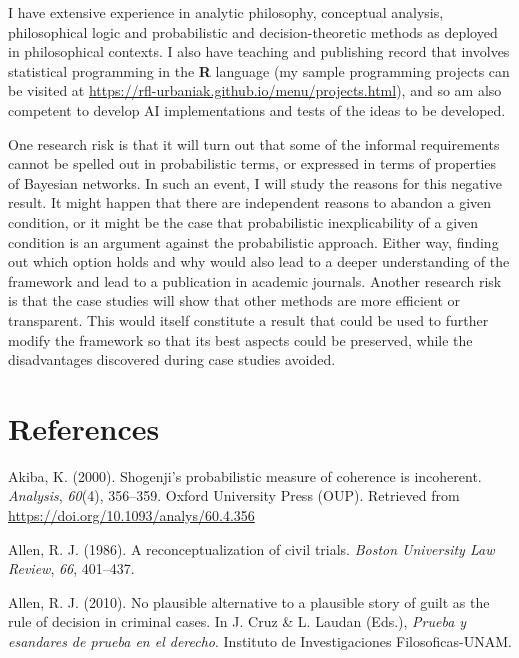 \documentclass[11pt,dvipsnames,enabledeprecatedfontcommands]{scrartcl}
\begin{document}
I have extensive experience in analytic philosophy, conceptual analysis,
philosophical logic and probabilistic and decision-theoretic methods as
deployed in philosophical contexts. I also have teaching and publishing
record that involves statistical programming in the \textsf{\textbf{R}}
language (my sample programming projects can be visited at
\url{https://rfl-urbaniak.github.io/menu/projects.html}), and so am also
competent to develop AI implementations and tests of the ideas to be
developed.

One research risk is that it will turn out that some of the informal
requirements cannot be spelled out in probabilistic terms, or expressed
in terms of properties of Bayesian networks. In such an event, I will
study the reasons for this negative result. It might happen that there
are independent reasons to abandon a given condition, or it might be the
case that probabilistic inexplicability of a given condition is an
argument against the probabilistic approach. Either way, finding out
which option holds and why would also lead to a deeper understanding of
the framework and lead to a publication in academic journals. Another
research risk is that the case studies will show that other methods are
more efficient or transparent. This would itself constitute a result
that could be used to further modify the framework so that its best
aspects could be preserved, while the disadvantages discovered during
case studies avoided.

\pagebreak 

\section*{References}\label{references}

\footnotesize 

\hypertarget{refs}{}
\hypertarget{ref-Akiba2000Shogenjis}{}
Akiba, K. (2000). Shogenji's probabilistic measure of coherence is
incoherent. \emph{Analysis}, \emph{60}(4), 356--359. Oxford University
Press (OUP). Retrieved from
\url{https://doi.org/10.1093/analys/60.4.356}

\hypertarget{ref-Allen1986A-Reconceptuali}{}
Allen, R. J. (1986). A reconceptualization of civil trials. \emph{Boston
University Law Review}, \emph{66}, 401--437.

\hypertarget{ref-Allen2010No-Plausible-Al}{}
Allen, R. J. (2010). No plausible alternative to a plausible story of
guilt as the rule of decision in criminal cases. In J. Cruz \& L. Laudan
(Eds.), \emph{Prueba y esandares de prueba en el derecho}. Instituto de
Investigaciones Filosoficas-UNAM.
\end{document}
